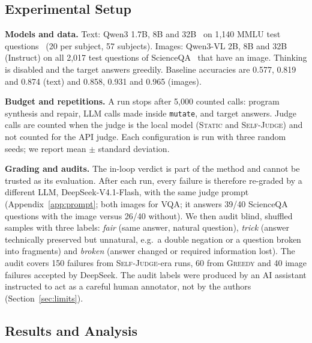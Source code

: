 \documentclass[sigconf]{acmart}
\newcommand{\HW}{\textsc{Static}}
\newcommand{\SJ}{\textsc{Self-Judge}}
\newcommand{\BOLD}{\textsc{Greedy}}
\begin{document}
\subsection{Experimental Setup}

\textbf{Models and data.} Text: Qwen3 1.7B, 8B and 32B~\cite{yang2025qwen3} on 1{,}140 MMLU test
questions~\cite{hendrycks2021mmlu} (20 per subject, 57 subjects). Images: Qwen3-VL 2B, 8B and 32B (Instruct) on all
2{,}017 test questions of ScienceQA~\cite{lu2022scienceqa} that have an image. Thinking is disabled and the target
answers greedily. Baseline accuracies are 0.577, 0.819 and 0.874 (text) and 0.858, 0.931 and 0.965 (images).

\textbf{Budget and repetitions.} A run stops after 5{,}000 counted calls: program synthesis and repair, LLM calls made
inside \texttt{mutate}, and target answers. Judge calls are counted when the judge is the local model (\HW{} and \SJ{}) and not
counted for the API judge. Each configuration is run with three random seeds; we report mean $\pm$ standard deviation.

\textbf{Grading and audits.} The in-loop verdict is part of the method and cannot be trusted as its evaluation.
After each run, every failure is therefore re-graded by a different LLM, DeepSeek-V4.1-Flash, with the same judge
prompt (Appendix~\ref{app:prompt}; both images for VQA; it answers 39/40 ScienceQA questions with the image versus 26/40
without). We then audit blind, shuffled samples with three labels: \emph{fair} (same answer, natural question),
\emph{trick} (answer technically preserved but unnatural, e.g.\ a double negation or a question broken into fragments)
and \emph{broken} (answer changed or required information lost). The audit covers 150 failures from \SJ{}-era runs,
60 from \BOLD{} and 40 image failures accepted by DeepSeek. The audit labels were produced by an AI assistant
instructed to act as a careful human annotator, not by the authors (Section~\ref{sec:limits}).

\subsection{Results and Analysis}
\label{sec:results}
\end{document}
